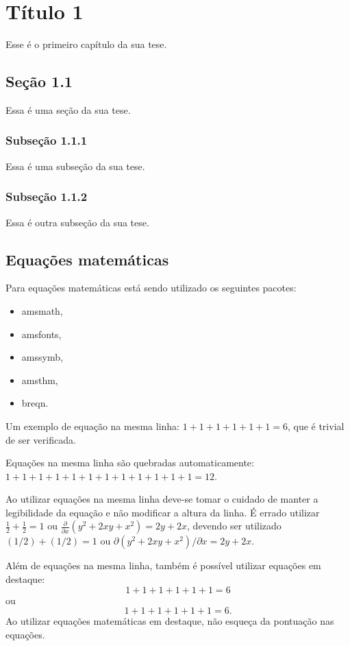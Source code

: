 \chapter{Título 1}
Esse é o primeiro capítulo da sua tese.

\section{Seção 1.1}
Essa é uma seção da sua tese.

\subsection{Subseção 1.1.1}

Essa é uma subseção da sua tese.

\subsection{Subseção 1.1.2}

Essa é outra subseção da sua tese.

\section{Equações matemáticas}
Para equações matemáticas está sendo utilizado os seguintes
pacotes:
\begin{itemize}
  \item amsmath,
  \item amsfonts,
  \item amssymb,
  \item amsthm,
  \item breqn.
\end{itemize}

Um exemplo de equação na mesma linha: 
$ 1 + 1 + 1 + 1 + 1 + 1 = 6$, 
que é trivial de ser verificada.

Equações na mesma linha são quebradas automaticamente:
$ 1 + 1 + 1 + 1 + 1 + 1 + 1 + 1 + 1 + 1 + 1 + 1 = 12$. 

Ao utilizar equações na mesma linha deve-se tomar o cuidado de manter a
legibilidade da equação e não modificar a altura da linha. É
errado utilizar $\frac{1}{2} + \frac{1}{2} = 1$ ou $\frac{\partial}{\partial x}
(y^2 + 2xy + x^2) = 2y + 2x$, devendo ser utilizado $(1/2) + (1/2) = 1$ ou
$\partial (y^2 + 2 x y + x^2) / \partial x = 2 y + 2 x$.

Além de equações na mesma linha, também é possível
utilizar equações em destaque:
\begin{equation}
  1 + 1 + 1 + 1 + 1 + 1 = 6
\end{equation}
ou
\begin{equation*}
  1 + 1 + 1 + 1 + 1 + 1 = 6.
\end{equation*}
Ao utilizar equações matemáticas em destaque, não esqueça da pontuação nas
equações.

